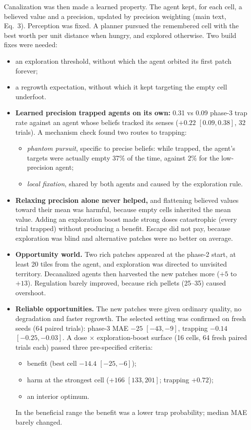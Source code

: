 \documentclass[11pt]{article}
\begin{document}
Canalization was then made a learned property. The agent kept, for each cell, a believed value and a precision, updated by precision weighting (main text, Eq.~3). Perception was fixed. A planner pursued the remembered cell with the best worth per unit distance when hungry, and explored otherwise. Two build fixes were needed:
\begin{itemize}
  \item an exploration threshold, without which the agent orbited its first patch forever;
  \item a regrowth expectation, without which it kept targeting the empty cell underfoot.
\end{itemize}

\begin{itemize}
  \item \textbf{Learned precision trapped agents on its own:} 0.31 vs 0.09 phase-3 trap rate against an agent whose beliefs tracked its senses ($+0.22$ $[0.09, 0.38]$, 32 trials). A mechanism check found two routes to trapping:
  \begin{itemize}
    \item \emph{phantom pursuit}, specific to precise beliefs: while trapped, the agent's targets were actually empty 37\% of the time, against 2\% for the low-precision agent;
    \item \emph{local fixation}, shared by both agents and caused by the exploration rule.
  \end{itemize}
  \item \textbf{Relaxing precision alone never helped,} and flattening believed values toward their mean was harmful, because empty cells inherited the mean value. Adding an exploration boost made strong doses catastrophic (every trial trapped) without producing a benefit. Escape did not pay, because exploration was blind and alternative patches were no better on average.
  \item \textbf{Opportunity world.} Two rich patches appeared at the phase-2 start, at least 20 tiles from the agent, and exploration was directed to unvisited territory. Decanalized agents then harvested the new patches more ($+5$ to $+13$). Regulation barely improved, because rich pellets (25--35) caused overshoot.
  \item \textbf{Reliable opportunities.} The new patches were given ordinary quality, no degradation and faster regrowth. The selected setting was confirmed on fresh seeds (64 paired trials): phase-3 MAE $-25$ $[-43, -9]$, trapping $-0.14$ $[-0.25, -0.03]$. A dose $\times$ exploration-boost surface (16 cells, 64 fresh paired trials each) passed three pre-specified criteria:
  \begin{itemize}
    \item benefit (best cell $-14.4$ $[-25, -6]$);
    \item harm at the strongest cell ($+166$ $[133, 201]$; trapping $+0.72$);
    \item an interior optimum.
  \end{itemize}
  In the beneficial range the benefit was a lower trap probability; median MAE barely changed.
\end{itemize}
\end{document}
